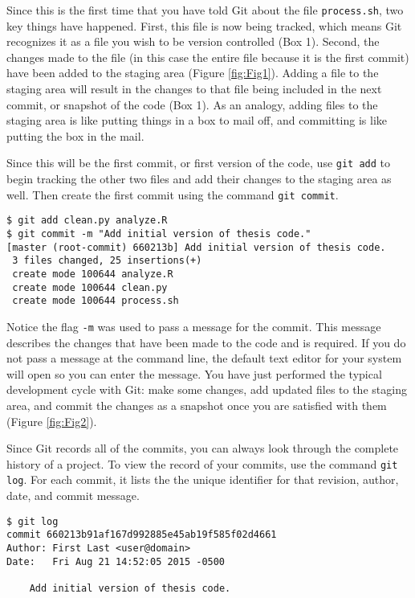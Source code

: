 Since this is the first time that you have told Git about the file \verb|process.sh|, two key things have happened.
First, this file is now being tracked, which means Git recognizes it as a file you wish to be version controlled (Box 1).
Second, the changes made to the file (in this case the entire file because it is the first commit) have been added to the staging area (Figure \ref{fig:Fig1}).
Adding a file to the staging area will result in the changes to that file being included in the next commit, or snapshot of the code (Box 1).
As an analogy, adding files to the staging area is like putting things in a box to mail off, and committing is like putting the box in the mail.

Since this will be the first commit, or first version of the code, use \verb|git add| to begin tracking the other two files and add their changes to the staging area as well.
Then create the first commit using the command \verb|git commit|.

\begin{verbatim}
$ git add clean.py analyze.R
$ git commit -m "Add initial version of thesis code."
[master (root-commit) 660213b] Add initial version of thesis code.
 3 files changed, 25 insertions(+)
 create mode 100644 analyze.R
 create mode 100644 clean.py
 create mode 100644 process.sh
\end{verbatim}

Notice the flag \verb|-m| was used to pass a message for the commit.
This message describes the changes that have been made to the code and is required.
If you do not pass a message at the command line, the default text editor for your system will open so you can enter the message.
You have just performed the typical development cycle with Git:
make some changes, add updated files to the staging area, and commit the changes as a snapshot once you are satisfied with them (Figure \ref{fig:Fig2}).

Since Git records all of the commits, you can always look through the complete history of a project.
To view the record of your commits, use the command \verb|git log|.
For each commit, it lists the the unique identifier for that revision, author, date, and commit message.

\begin{verbatim}
$ git log
commit 660213b91af167d992885e45ab19f585f02d4661
Author: First Last <user@domain>
Date:   Fri Aug 21 14:52:05 2015 -0500

    Add initial version of thesis code.
\end{verbatim}

